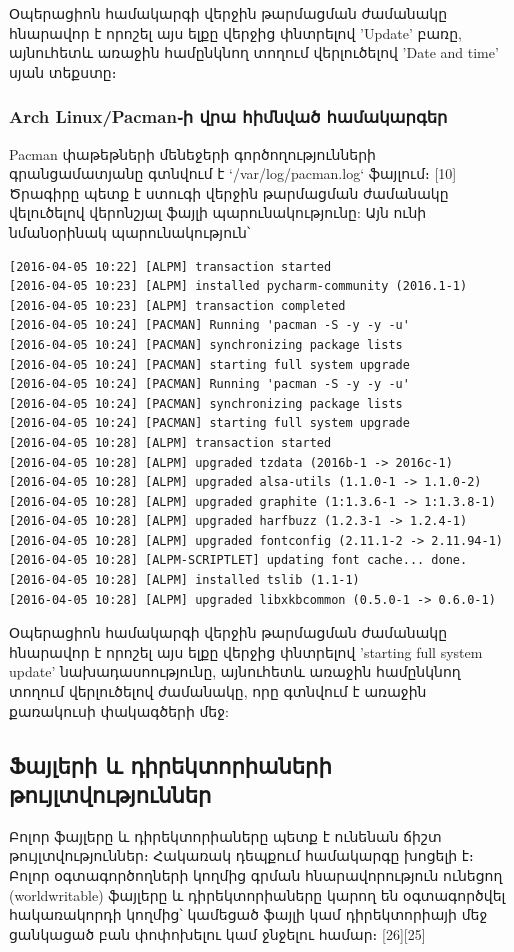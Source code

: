 \documentclass[a4paper,12pt]{article}
\begin{document}
\begin{sloppypar}
Օպերացիոն համակարգի վերջին թարմացման ժամանակը հնարավոր է որոշել
այս ելքը վերջից փնտրելով 'Update' բառը, այնուհետև
առաջին համընկնող տողում վերլուծելով 'Date and time' սյան տեքստը։

\subsubsection{Arch Linux/Pacman֊ի վրա հիմնված համակարգեր}

Pacman փաթեթների մենեջերի գործողությունների գրանցամատյանը
գտնվում է `/var/log/pacman.log` ֆայլում։ [10] Ծրագիրը պետք է ստուգի
վերջին թարմացման ժամանակը վելուծելով վերոնշյալ ֆայլի պարունակությունը:
Այն ունի նմանօրինակ պարունակություն՝

\begin{lstlisting}[language={}]
[2016-04-05 10:22] [ALPM] transaction started
[2016-04-05 10:23] [ALPM] installed pycharm-community (2016.1-1)
[2016-04-05 10:23] [ALPM] transaction completed
[2016-04-05 10:24] [PACMAN] Running 'pacman -S -y -y -u'
[2016-04-05 10:24] [PACMAN] synchronizing package lists
[2016-04-05 10:24] [PACMAN] starting full system upgrade
[2016-04-05 10:24] [PACMAN] Running 'pacman -S -y -y -u'
[2016-04-05 10:24] [PACMAN] synchronizing package lists
[2016-04-05 10:24] [PACMAN] starting full system upgrade
[2016-04-05 10:28] [ALPM] transaction started
[2016-04-05 10:28] [ALPM] upgraded tzdata (2016b-1 -> 2016c-1)
[2016-04-05 10:28] [ALPM] upgraded alsa-utils (1.1.0-1 -> 1.1.0-2)
[2016-04-05 10:28] [ALPM] upgraded graphite (1:1.3.6-1 -> 1:1.3.8-1)
[2016-04-05 10:28] [ALPM] upgraded harfbuzz (1.2.3-1 -> 1.2.4-1)
[2016-04-05 10:28] [ALPM] upgraded fontconfig (2.11.1-2 -> 2.11.94-1)
[2016-04-05 10:28] [ALPM-SCRIPTLET] updating font cache... done.
[2016-04-05 10:28] [ALPM] installed tslib (1.1-1)
[2016-04-05 10:28] [ALPM] upgraded libxkbcommon (0.5.0-1 -> 0.6.0-1)
\end{lstlisting}

Օպերացիոն համակարգի վերջին թարմացման ժամանակը հնարավոր է որոշել
այս ելքը վերջից փնտրելով 'starting full system update' նախադասոությունը,
այնուհետև առաջին համընկնող տողում վերլուծելով ժամանակը, որը գտնվում է
առաջին քառակուսի փակագծերի մեջ:


\subsection{Ֆայլերի և դիրեկտորիաների թույլտվություններ}


Բոլոր ֆայլերը և դիրեկտորիաները պետք է ունենան ճիշտ թույլտվություններ։
Հակառակ դեպքում համակարգը խոցելի է։
Բոլոր օգտագործողների կողմից գրման հնարավորություն ունեցող (worldwritable)
ֆայլերը և դիրեկտորիաները կարող են օգտագործվել հակառակորդի կողմից՝
կամեցած ֆայլի կամ դիրեկտորիայի մեջ ցանկացած բան փոփոխելու կամ ջնջելու
համար։ [26][25]


\end{sloppypar}
\end{document}
